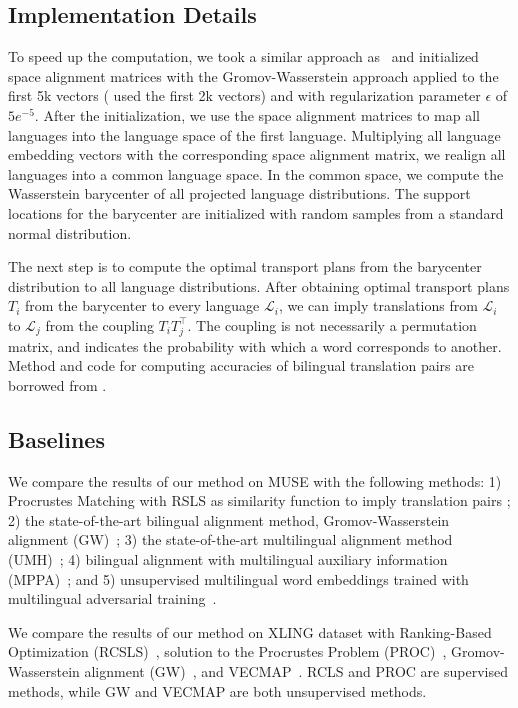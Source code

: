 \documentclass{article}
\begin{document}
\subsection{Implementation Details} 
To speed up the computation, we took a similar approach as~\citet{AlauxGCJ19} and initialized space alignment matrices with the Gromov-Wasserstein approach \cite{AlvarezMelisJaakkola18} applied to the first 5k vectors (\citet{AlauxGCJ19} used the first 2k vectors) and with regularization parameter $\epsilon$ of $5e^{-5}$. 
After the initialization, we use the space alignment matrices to map all languages into the language space of the first language. Multiplying all language embedding vectors with the corresponding space alignment matrix, we realign all languages into a common language space.
In the common space, we compute the Wasserstein barycenter of all projected language distributions. The support locations for the barycenter are initialized with random samples from a standard normal distribution.

The next step is to compute the optimal transport plans from the barycenter distribution to all language distributions. After obtaining optimal transport plans $T_i$ from the barycenter to every language $\mathcal{L}_i$, we can imply translations from $\mathcal{L}_i$ to $\mathcal{L}_j$ from the coupling $T_i T_j^\top$.
The coupling is not necessarily a permutation matrix, and indicates the probability with which a word corresponds to another. 
Method and code for computing accuracies of bilingual translation pairs are borrowed from \citet{AlvarezMelisJaakkola18}.

\subsection{Baselines} We compare the results of our method on MUSE with the following methods: 1) Procrustes Matching with RSLS as similarity function to imply translation pairs \cite{LampleCRDJ18};
2) the state-of-the-art bilingual alignment method, Gromov-Wasserstein alignment (GW)~\cite{AlvarezMelisJaakkola18}; 3) the state-of-the-art multilingual alignment method (UMH)~\cite{AlauxGCJ19}; 4) bilingual alignment with multilingual auxiliary information (MPPA)~\cite{TaitelbaumCG19a}; and 5) unsupervised multilingual word embeddings trained with multilingual adversarial training~\cite{ChenCardie18}.

We compare the results of our method on XLING dataset with Ranking-Based Optimization (RCSLS)~\cite{JoulinBMJG18},  solution to the Procrustes Problem (PROC)~\cite{ArtetxeLA18a,LampleCRDJ18,glavas-etal-2019-properly}, Gromov-Wasserstein alignment (GW)~\cite{AlvarezMelisJaakkola18}, and VECMAP~\cite{ArtetxeLA18a}. RCLS and PROC are supervised methods, while GW and VECMAP are both unsupervised methods. 
\end{document}
